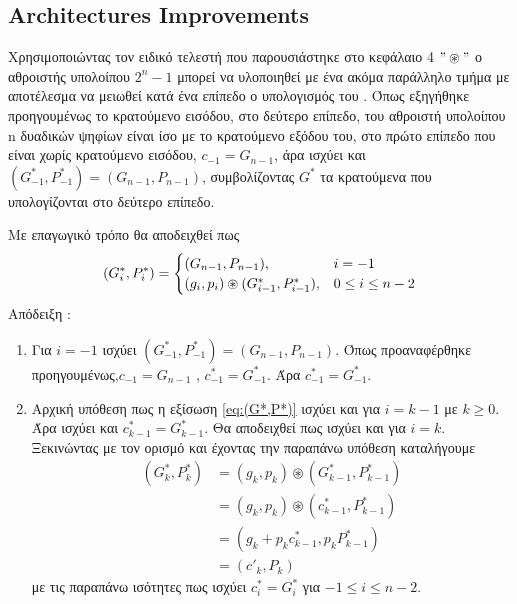 \subsection{Architectures Improvements}

Χρησιμοποιώντας τον ειδικό τελεστή που παρουσιάστηκε στο κεφάλαιο 4 $"\circledast"$
ο αθροιστής υπολοίπου $2^n-1$ μπορεί να υλοποιηθεί με ένα ακόμα παράλληλο τμήμα 
με αποτέλεσμα να μειωθεί κατά ένα επίπεδο ο υπολογισμός του \cite{vergos}.
Όπως εξηγήθηκε προηγουμένως το κρατούμενο εισόδου, στο δεύτερο επίπεδο, του αθροιστή υπολοίπου n
δυαδικών ψηφίων είναι ίσο με το κρατούμενο εξόδου  του, στο πρώτο επίπεδο που είναι 
χωρίς κρατούμενο εισόδου, $c_{-1} = G_{n-1}$, άρα ισχύει και 
$(G^*_{-1},P^*_{-1}) = (G_{n-1},P_{n-1})$, συμβολίζοντας $G^*$ τα κρατούμενα που υπολογίζονται 
στο δεύτερο επίπεδο.

Με επαγωγικό τρόπο θα αποδειχθεί πως
\begin{equation}
\label{eq:(G*,P*)}
\equationame{Εξίσωση κρατουμένων του $2^n-1$ αθροιστή}
    (G^*_i,P^*_i) =
    \begin{cases}
        (G_{n-1},P_{n-1}) ,& i = -1\\
        (g_i,p_i)\circledast(G^*_{i-1},P^*_{i-1}) ,& 0\leq i \leq n-2
    \end{cases}
\end{equation}
Απόδειξη :
\begin{enumerate}
    \item Για $i=-1$ ισχύει $(G^*_{-1},P^*_{-1}) = (G_{n-1},P_{n-1})$. Όπως προαναφέρθηκε προηγουμένως,$c_{-1} = G_{n-1}$ , $c^*_{-1} = G^*_{-1}$. Άρα $c^*_{-1} = G^*_{-1}$.
    \item Αρχική υπόθεση πως η εξίσωση \ref{eq:(G*,P*)} ισχύει και για $i=k-1$ με $k \geq 0$.
    Άρα ισχύει και $c^*_{k-1} = G^*_{k-1}$. Θα αποδειχθεί πως ισχύει και για $i=k$. Ξεκινώντας 
    με τον ορισμό και έχοντας την παραπάνω υπόθεση καταλήγουμε 
    \begin{equation*}
    \begin{split}
        (G^*_k,P^*_k) &= (g_k,p_k) \circledast (G^*_{k-1},P^*_{k-1})\\
        &= (g_k,p_k) \circledast (c^*_{k-1},P^*_{k-1})\\
        &= (g_k + p_k c^*_{k-1} , p_k P^*_{k-1})\\
        &= (c'_{k},P_k)
    \end{split}
    \end{equation*}
    με τις παραπάνω ισότητες πως ισχύει $c^*_i = G^*_i$ για $-1 \leq i \leq n-2$.
\end{enumerate}

